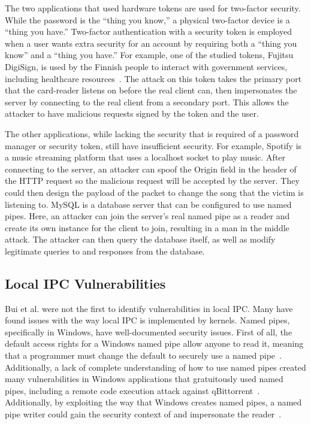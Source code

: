 The two applications that used hardware tokens are used for two-factor security.  While the password is the ``thing you know,'' a physical two-factor device is a ``thing you have.''  Two-factor authentication with a security token is employed when a user wants extra security for an account by requiring both a ``thing you know'' and a ``thing you have.''  For example, one of the studied tokens, Fujitsu DigiSign, is used by the Finnish people to interact with government services, including healthcare resources~\cite{MitMa}.  The attack on this token takes the primary port that the card-reader listens on before the real client can, then impersonates the server by connecting to the real client from a secondary port.  This allows the attacker to have malicious requests signed by the token and the user.

The other applications, while lacking the security that is required of a password manager or security token, still have insufficient security.  For example, Spotify is a music streaming platform that uses a localhost socket to play music.  After connecting to the server, an attacker can spoof the Origin field in the header of the HTTP request so the malicious request will be accepted by the server.  They could then design the payload of the packet to change the song that the victim is listening to.  MySQL is a database server that can be configured to use named pipes.  Here, an attacker can join the server's real named pipe as a reader and create its own instance for the client to join, resulting in a man in the middle attack.  The attacker can then query the database itself, as well as modify legitimate queries to and responses from the database.

\subsection{Local IPC Vulnerabilities}
\label{localIPCVulnerabilities}
Bui et al. were not the first to identify vulnerabilities in local IPC.  Many have found issues with the way local IPC is implemented by kernels.  Named pipes, specifically in Windows, have well-documented security issues.  First of all, the default access rights for a Windows named pipe allow anyone to read it, meaning that a programmer must change the default to securely use a named pipe~\cite{microsoft_2018}.  Additionally, a lack of complete understanding of how to use named pipes created many vulnerabilities in Windows applications that gratuitously used named pipes, including a remote code execution attack against qBittorrent~\cite{cohen_2019}.  Additionally, by exploiting the way that Windows creates named pipes, a named pipe writer could gain the security context of and impersonate the reader~\cite{watts2002discovering}.


